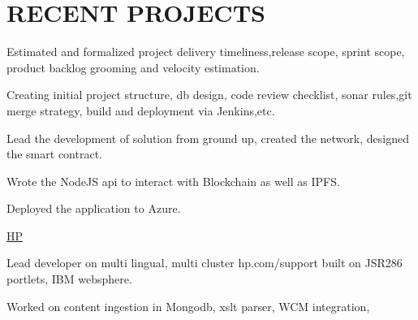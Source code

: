 \documentclass[]{deedy-resume-openfont}
\begin{document}
\begin{minipage}[t]{0.66\textwidth}

\section{RECENT PROJECTS}
\begin{tightemize}
\item Estimated and formalized project delivery timeliness,release scope, sprint scope, product backlog grooming and velocity estimation. 
\item Creating initial project structure, db design, code review checklist, sonar rules,git merge strategy, build and deployment via Jenkins,etc.
\end{tightemize}
\sectionsep

\begin{tightemize}
\item Lead the development of solution from ground up, created the network, designed the smart contract.
\item Wrote the NodeJS api to interact with Blockchain as well as IPFS.
\item Deployed the application to Azure.
\end{tightemize}
\sectionsep

\href{https://support.hp.com/us-en}{HP} 
\begin{tightemize}
\item Lead developer on multi lingual, multi cluster hp.com/support built on JSR286 portlets, IBM websphere.
\item Worked on content ingestion in Mongodb, xslt parser, WCM integration, \end{tightemize}
\sectionsep
\end{minipage} 
\end{document}
